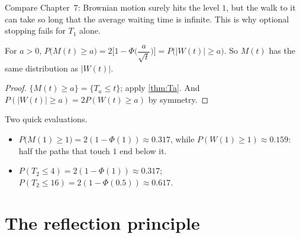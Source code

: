 Compare Chapter~7: Brownian motion surely hits the level $1$, but the walk to it can take so long that the average waiting time is infinite. This is why optional stopping fails for $T_1$ alone.

\begin{pic}
\end{pic}

\begin{result}
\label{res:max}
For $a>0$, $P\big(M(t)\ge a\big)=2\Big[1-\Phi\Big(\dfrac{a}{\sqrt t}\Big)\Big]=P\big(|W(t)|\ge a\big)$. So $M(t)$ has the same distribution as $|W(t)|$.
\end{result}
\begin{proof}
$\{M(t)\ge a\}=\{T_a\le t\}$; apply \cref{thm:Ta}. And $P(|W(t)|\ge a)=2P(W(t)\ge a)$ by symmetry.
\end{proof}

\begin{example}[Numbers]
\label{ex:max-num}
Two quick evaluations.
\begin{itemize}
  \item $P\big(M(1)\ge1\big)=2(1-\Phi(1))\approx0.317$, while $P(W(1)\ge1)\approx0.159$: half the paths that touch $1$ end below it.
  \item $P(T_2\le4)=2(1-\Phi(1))\approx0.317$; $P(T_2\le16)=2(1-\Phi(0.5))\approx0.617$.
\end{itemize}
\end{example}

\section{The reflection principle}

